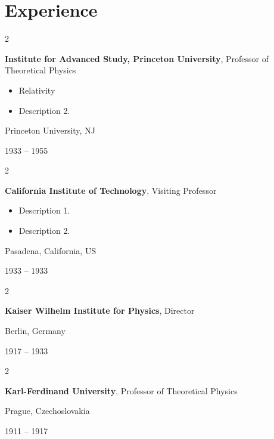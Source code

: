 \documentclass[10pt, letterpaper]{article}
\newenvironment{highlights}{
    \begin{itemize}[
        topsep=0.10 cm,
        parsep=0.10 cm,
        partopsep=0pt,
        itemsep=0pt,
        leftmargin=0.4 cm + 10pt
    ]
}{
    \end{itemize}
} %
\newenvironment{twocolentry}[2][]{
    \onecolentry
    \def\secondColumn{#2}
    \setcolumnwidth{\fill, 4.5 cm}
    \begin{paracol}{2}
}{
    \switchcolumn \raggedleft \secondColumn
    \end{paracol}
    \endonecolentry
} %
\begin{document}
    
    \section{Experience}



        
        \begin{twocolentry}{
            Princeton University, NJ

        1933 – 1955
        }
            \textbf{Institute for Advanced Study, Princeton University}, Professor of Theoretical Physics
            \begin{highlights}
                \item Relativity
                \item Description 2.
            \end{highlights}
        \end{twocolentry}


        \vspace{0.2 cm}

        \begin{twocolentry}{
            Pasadena, California, US

        1933 – 1933
        }
            \textbf{California Institute of Technology}, Visiting Professor
            \begin{highlights}
                \item Description 1.
                \item Description 2.
            \end{highlights}
        \end{twocolentry}


        \vspace{0.2 cm}

        \begin{twocolentry}{
            Berlin, Germany

        1917 – 1933
        }
            \textbf{Kaiser Wilhelm Institute for Physics}, Director
        \end{twocolentry}


        \vspace{0.2 cm}

        \begin{twocolentry}{
            Prague, Czechoslovakia

        1911 – 1917
        }
            \textbf{Karl-Ferdinand University}, Professor of Theoretical Physics
        \end{twocolentry}
\end{document}
